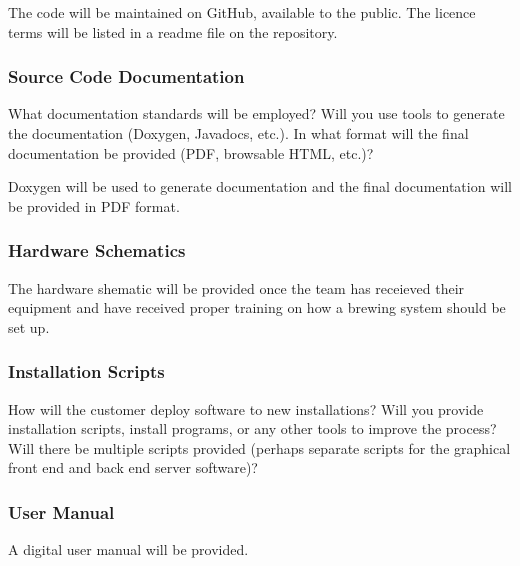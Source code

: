 The code will be maintained on GitHub, available to the public. The licence terms will be listed in a readme file on the repository.

\subsubsection{Source Code Documentation}
What documentation standards will be employed? Will you use tools to generate the documentation (Doxygen, Javadocs, etc.). In what format will the final documentation be provided (PDF, browsable HTML, etc.)?

Doxygen will be used to generate documentation and the final documentation will be provided in PDF format.

\subsubsection{Hardware Schematics}
The hardware shematic will be provided once the team has receieved their equipment and have received proper training on how a brewing system should be set up. 



\subsubsection{Installation Scripts}
How will the customer deploy software to new installations? Will you provide installation scripts, install programs, or any other tools to improve the process? Will there be multiple scripts provided (perhaps separate scripts for the graphical front end and back end server software)?

\subsubsection{User Manual}

A digital user manual will be provided.

